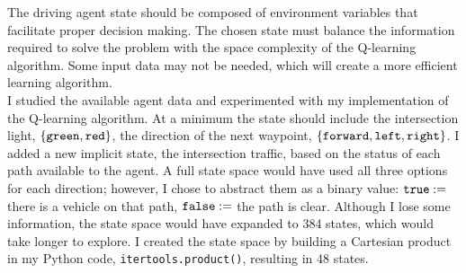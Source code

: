 \documentclass[12pt,letterpaper]{article}
\begin{document}
The driving agent state should be composed of environment variables that facilitate proper decision making.
The chosen state must balance the information required to solve the problem with the space complexity of the Q-learning algorithm.
Some input data may not be needed, which will create a more efficient learning algorithm. \\

I studied the available agent data and experimented with my implementation of the Q-learning algorithm.
At a minimum the state should include the intersection light, $\{\verb|green|,\verb|red|\}$, the direction of the next waypoint, $\{\verb|forward|,\verb|left|,\verb|right|\}$.
I added a new implicit state, the intersection traffic, based on the status of each path available to the agent.
A full state space would have used all three options for each direction; however, I chose to abstract them as a binary value: $\verb|true| := $ there is a vehicle on that path, $\verb|false|:=$ the path is clear.
Although I lose some information, the state space would have expanded to 384 states, which would take longer to explore.
I created the state space by building a Cartesian product in my Python code, \verb|itertools.product()|, resulting in 48 states.

\end{document}

